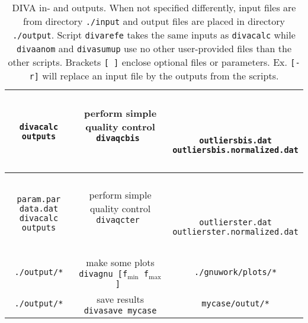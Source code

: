 \begin{table}
\begin{center}
{{\begin{tabular}{c|c|c}
{{\tt divacalc outputs}
}
 & 
\shortstack{
{  { }  } \\
{\sf perform simple quality control} \\
{\tt divaqcbis } 
\\
{  { }  } \\
{  { }  } \\
{  { }  }
}
& 
\shortstack{
{  { }  } \\
{  { }  } \\
{  { }  } \\
{{\tt outliersbis.dat}} \\
{{\tt outliersbis.normalized.dat}} \\
{  { }  } \\
{  { }  } 
} 
\\ \hline
 \shortstack{
 {\tt param.par} \\
 {\tt data.dat} \\
{\tt divacalc outputs}
}
 & 
\shortstack{
{  { }  } \\
{\sf perform simple quality control} \\
{\tt divaqcter } 
\\
{  { }  } \\
{  { }  } \\
{  { }  }
}
& 
\shortstack{
{  { }  } \\
{  { }  } \\
{  { }  } \\
{{\tt outlierster.dat}} \\
{{\tt outlierster.normalized.dat}} \\
{  { }  } \\
{  { }  } 
} \\ \hline
{\tt ./output/*}  & 
\shortstack{
{\sf make some plots} \\
{\tt divagnu [f$_{\min}$ f$_{\max}$] } 
} & {\tt ./gnuwork/plots/*} \\ \hline
{\tt ./output/*}  & 
\shortstack{
{\sf save results} \\
{\tt divasave mycase} 
}
& {\tt mycase/outut/*} \\ \hline
\end{tabular}
\caption{DIVA in- and outputs. When not specified differently, input files are from directory  {\tt ./input} and 
output files are placed in directory {\tt ./output}.  Script {\tt divarefe} takes the same inputs as {\tt divacalc}
while {\tt divaanom} and {\tt divasumup} use no other user-provided files than the other scripts. Brackets {\tt [ ]} enclose optional files or parameters. Ex. {\tt [-r]} will replace an input file by the outputs from the scripts.
}
\label{vdm}
}}
\end{center}
\end{table}


